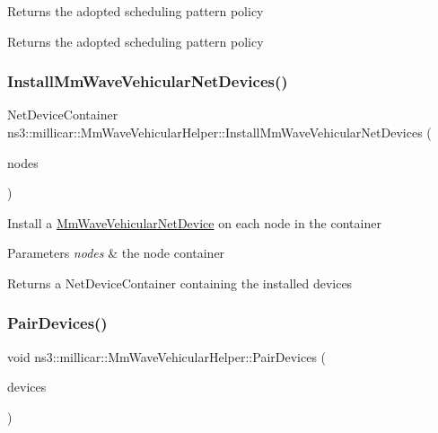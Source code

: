 Returns the adopted scheduling pattern policy \begin{DoxyReturn}{Returns}
the adopted scheduling pattern policy 
\end{DoxyReturn}
\mbox{\label{classns3_1_1millicar_1_1MmWaveVehicularHelper_adb23c9d4f13972fd3bac3b35a23582c4}} 
\subsubsection{\texorpdfstring{Install\+Mm\+Wave\+Vehicular\+Net\+Devices()}{InstallMmWaveVehicularNetDevices()}}
{\footnotesize\ttfamily Net\+Device\+Container ns3\+::millicar\+::\+Mm\+Wave\+Vehicular\+Helper\+::\+Install\+Mm\+Wave\+Vehicular\+Net\+Devices (\begin{DoxyParamCaption}\item[{Node\+Container}]{nodes }\end{DoxyParamCaption})}

Install a \hyperlink{classns3_1_1millicar_1_1MmWaveVehicularNetDevice}{Mm\+Wave\+Vehicular\+Net\+Device} on each node in the container 
\begin{DoxyParams}{Parameters}
{\em nodes} & the node container \\
\hline
\end{DoxyParams}
\begin{DoxyReturn}{Returns}
a Net\+Device\+Container containing the installed devices 
\end{DoxyReturn}
\mbox{\label{classns3_1_1millicar_1_1MmWaveVehicularHelper_ad534c932d9a9ff86e41fa6f09377001f}} 
\subsubsection{\texorpdfstring{Pair\+Devices()}{PairDevices()}}
{\footnotesize\ttfamily void ns3\+::millicar\+::\+Mm\+Wave\+Vehicular\+Helper\+::\+Pair\+Devices (\begin{DoxyParamCaption}\item[{Net\+Device\+Container}]{devices }\end{DoxyParamCaption})}

